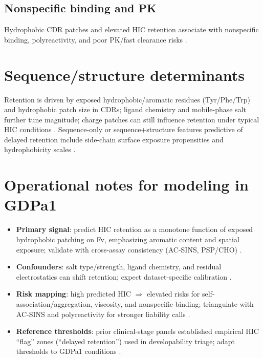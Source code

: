 \documentclass[11pt]{article}
\begin{document}
\subsection*{Nonspecific binding and PK}
Hydrophobic CDR patches and elevated HIC retention associate with nonspecific binding, polyreactivity, and poor PK/fast clearance risks \citep{Bailly2020,Grinshpun2021,Ausserwoger2023}.

\section{Sequence/structure determinants}
Retention is driven by exposed hydrophobic/aromatic residues (Tyr/Phe/Trp) and hydrophobic patch size in CDRs; ligand chemistry and mobile-phase salt further tune magnitude; charge patches can still influence retention under typical HIC conditions \citep{Hebditch2019,Ewonde2024,Waibl2022}. Sequence-only or sequence+structure features predictive of delayed retention include side-chain surface exposure propensities and hydrophobicity scales \citep{Jain2017Bioinf,Waibl2022,Karlberg2020}.

\section{Operational notes for modeling in GDPa1}
\begin{itemize}\itemsep0.25em
  \item \textbf{Primary signal}: predict HIC retention as a monotone function of exposed hydrophobic patching on Fv, emphasizing aromatic content and spatial exposure; validate with cross-assay consistency (AC-SINS, PSP/CHO) \citep{Jain2017Bioinf,Estep2015,GDPa1HF}.
  \item \textbf{Confounders}: salt type/strength, ligand chemistry, and residual electrostatics can shift retention; expect dataset-specific calibration \citep{Ewonde2024,EwondeProtocol2022,Baca2016}.
  \item \textbf{Risk mapping}: high predicted HIC $\Rightarrow$ elevated risks for self-association/aggregation, viscosity, and nonspecific binding; triangulate with AC-SINS and polyreactivity for stronger liability calls \citep{Estep2015,Armstrong2024,Bailly2020,Grinshpun2021}.
  \item \textbf{Reference thresholds}: prior clinical-stage panels established empirical HIC ``flag'' zones (``delayed retention'') used in developability triage; adapt thresholds to GDPa1 conditions \citep{Jain2017PNAS,Jain2017Bioinf}.
\end{itemize}
\end{document}
